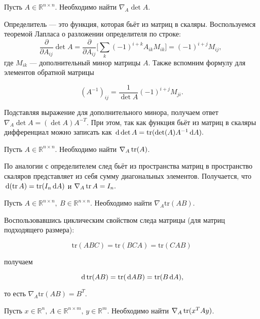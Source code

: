 \documentclass[12pt,fleqn]{article}
\newcommand{\dx}[1]{\,\mathrm{d}#1} %
\begin{document}
\begin{vkProblem} Пусть $A \in \mathbb{R}^{n\times n}$. Необходимо найти $\nabla_A \det A$.
\end{vkProblem}

\begin{esSolution} Определитель --- это функция, которая бьёт из матриц в скаляры. Воспользуемся теоремой Лапласа о разложении определителя по строке:
    \[\frac{\partial}{\partial A_{ij}} \det A = \frac{\partial}{\partial A_{ij}}\bigg[\sum_k (-1)^{i+k}A_{ik}M_{ik}\bigg] = (-1)^{i+j}M_{ij}, \; \]
где $M_{ik}$ --- дополнительный минор матрицы $A$. Также вспомним формулу для элементов обратной матрицы
    
    \[(A^{-1})_{ij} = \frac{1}{\det A}(-1)^{i+j}M_{ji}.\]
    
    Подставляя выражение для дополнительного минора, получаем ответ $\nabla_A \det A = (\det A) A^{-T}$. При этом, так как функция бьёт из матриц в скаляры дифференциал можно записать как  $\dx{ \det A} = \Tr(\det (A) A^{-1} \dx{A}).$
\end{esSolution} 


\begin{vkProblem} Пусть $A \in \mathbb{R}^{n\times n}$. Необходимо найти $\nabla_A \mathop{\mathrm{tr}}(A)$.
\end{vkProblem}

\begin{esSolution} 
По аналогии с определителем след бьёт из пространства матриц в пространство скаляров представляет из себя сумму диагональных элементов. Получается, что $\dx{(\Tr A)} = \Tr(I_n \dx A)$ и $\nabla_A \mathop{\mathrm{tr}} A = I_n.$
\end{esSolution} 
    
\begin{vkProblem} Пусть $A \in \mathbb{R}^{n \times n},\ B \in \mathbb{R}^{n \times n}$. Необходимо найти $\nabla_A \text{tr}(AB)$. 
\end{vkProblem}

\begin{esSolution}
Воспользовавшись циклическим свойством следа матрицы (для матриц подходящего размера): 

\[
\text{tr}(ABC) = \text{tr}(BCA) = \text{tr}(CAB)
\]

получаем 

\[ 
\dx{\Tr(AB)} = \Tr(\dx{AB}) = \Tr(B\dx{A}),
\]

то есть $\nabla_A \text{tr}(AB) = B^T.$
\end{esSolution}


\begin{vkProblem} Пусть $x \in \mathbb{R}^n, \, A \in \mathbb{R}^{n \times m}, \, y \in \mathbb{R}^m.$ Необходимо найти $\nabla_A \mathop{\mathrm{tr}}(x^TAy)$. 
\end{vkProblem}
\end{document}
